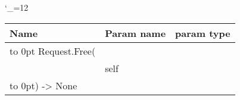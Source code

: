 \begingroup \catcode`\_=12 \tt
\begin{tabular}{lll}
\toprule
\textrm{Name}&\textrm{Param name}&\textrm{param type}\\
\midrule
\hbox to 0pt {Request.Free(\hss}\\
& self\\
\hbox to 0pt{) -> None\hss}\\
\bottomrule
\end{tabular}
\endgroup
